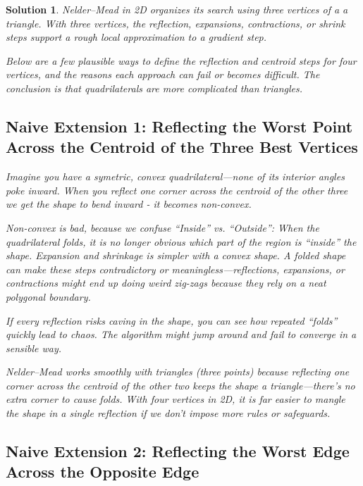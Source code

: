 \documentclass[a4paper,12pt]{article}
\theoremstyle{breaktheorem}
\theoremstyle{exerciseStyle}
\theoremstyle{solutionStyle}
\newtheorem{solution}{Solution}[section]
\begin{document}
\begin{solution}
    
    Nelder–Mead in 2D organizes its search using three vertices of a a triangle.
    With three vertices, the reflection, expansions, contractions, or shrink steps support a rough local approximation to a gradient step. 
 
    Below are a few plausible ways to define the reflection and centroid steps for four vertices,
     and the reasons each approach can fail or becomes difficult. 
    The conclusion is that quadrilaterals are more complicated than triangles.
    
    
    \subsection*{Naive Extension 1: Reflecting the Worst Point Across the Centroid of the Three Best Vertices}
    
    Imagine you have a symetric, convex quadrilateral—none of its interior angles poke inward.
    When you reflect one corner across the centroid of the other three we get the shape to bend inward - 
    it becomes non-convex. 

    Non-convex is bad, because we confuse “Inside” vs. “Outside”: When the quadrilateral folds, 
    it is no longer obvious which part of the region is “inside” the shape. 
    Expansion and shrinkage is simpler with a convex shape.
    A folded shape can make these steps contradictory or meaningless—reflections, expansions, or contractions might end up doing weird zig-zags because they rely on a neat polygonal boundary.

    
    If every reflection risks caving in the shape, you can see how repeated “folds” quickly lead to chaos.
     The algorithm might jump around and fail to converge in a sensible way.
    
    Nelder–Mead works smoothly with triangles (three points) because reflecting one corner across the centroid of the other two keeps the shape a triangle—there’s no extra corner to cause folds. With four vertices in 2D, it is far easier to mangle the shape in a single reflection if we don’t impose more rules or safeguards.
  
    \subsection*{Naive Extension 2: Reflecting the Worst Edge Across the Opposite Edge}
    

\end{solution}
\end{document}
